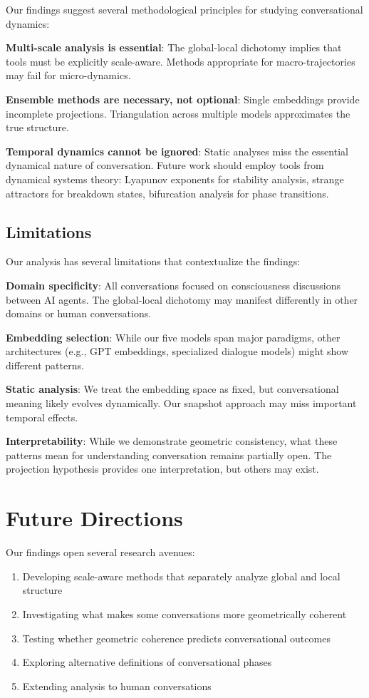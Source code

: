 \documentclass[11pt,letterpaper]{article}
\begin{document}
Our findings suggest several methodological principles for studying conversational dynamics:

\textbf{Multi-scale analysis is essential}: The global-local dichotomy implies that tools must be explicitly scale-aware. Methods appropriate for macro-trajectories may fail for micro-dynamics.

\textbf{Ensemble methods are necessary, not optional}: Single embeddings provide incomplete projections. Triangulation across multiple models approximates the true structure.

\textbf{Temporal dynamics cannot be ignored}: Static analyses miss the essential dynamical nature of conversation. Future work should employ tools from dynamical systems theory: Lyapunov exponents for stability analysis, strange attractors for breakdown states, bifurcation analysis for phase transitions.

\subsection{Limitations}

Our analysis has several limitations that contextualize the findings:

\textbf{Domain specificity}: All conversations focused on consciousness discussions between AI agents. The global-local dichotomy may manifest differently in other domains or human conversations.

\textbf{Embedding selection}: While our five models span major paradigms, other architectures (e.g., GPT embeddings, specialized dialogue models) might show different patterns.

\textbf{Static analysis}: We treat the embedding space as fixed, but conversational meaning likely evolves dynamically. Our snapshot approach may miss important temporal effects.

\textbf{Interpretability}: While we demonstrate geometric consistency, what these patterns mean for understanding conversation remains partially open. The projection hypothesis provides one interpretation, but others may exist.

\section{Future Directions}

Our findings open several research avenues:

\begin{enumerate}
\item Developing scale-aware methods that separately analyze global and local structure
\item Investigating what makes some conversations more geometrically coherent
\item Testing whether geometric coherence predicts conversational outcomes
\item Exploring alternative definitions of conversational phases
\item Extending analysis to human conversations
\end{enumerate}
\end{document}
